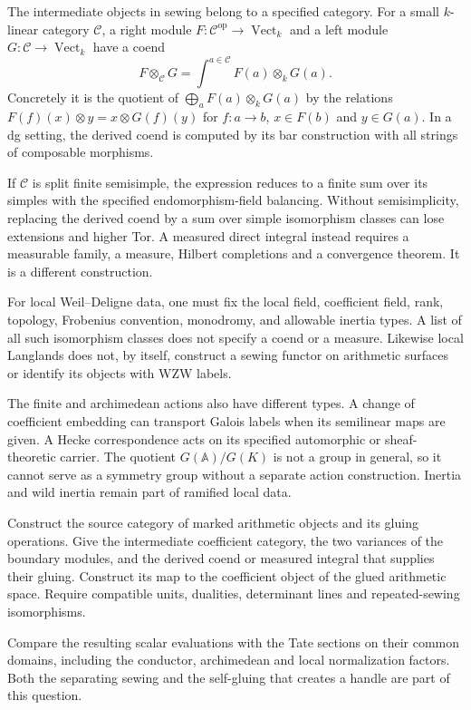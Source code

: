 The intermediate objects in sewing belong to a specified category. For a
small $k$-linear category $\mathcal C$, a right module $F:\mathcal
C^{\mathrm{op}}\to\operatorname{Vect}_k$ and a left module $G:\mathcal
C\to\operatorname{Vect}_k$ have a coend
\[
 F\otimes_{\mathcal C}G
    =\int^{a\in\mathcal C}F(a)\otimes_kG(a).
\]
Concretely it is the quotient of $\bigoplus_a F(a)\otimes_kG(a)$ by the
relations $F(f)(x)\otimes y=x\otimes G(f)(y)$ for $f:a\to b$, $x\in F(b)$
and $y\in G(a)$. In a dg setting, the derived coend is computed by its bar
construction with all strings of composable morphisms.

If $\mathcal C$ is split finite semisimple, the expression reduces to a
finite sum over its simples with the specified endomorphism-field balancing.
Without semisimplicity, replacing the derived coend by a sum over simple
isomorphism classes can lose extensions and higher Tor. A measured direct
integral instead requires a measurable family, a measure, Hilbert
completions and a convergence theorem. It is a different construction.

For local Weil--Deligne data, one must fix the local field, coefficient
field, rank, topology, Frobenius convention, monodromy, and allowable
inertia types. A list of all such isomorphism classes does not specify a
coend or a measure. Likewise local Langlands does not, by itself, construct
a sewing functor on arithmetic surfaces or identify its objects with WZW
labels.

The finite and archimedean actions also have different types. A change of
coefficient embedding can transport Galois labels when its semilinear maps
are given. A Hecke correspondence acts on its specified automorphic or
sheaf-theoretic carrier. The quotient $G(\mathbb A)/G(K)$ is not a group in
general, so it cannot serve as a symmetry group without a separate action
construction. Inertia and wild inertia remain part of ramified local data.

\begin{question}
\label{v4-arith:traces:sewing-question}
Construct the source category of marked arithmetic objects and its gluing
operations. Give the intermediate coefficient category, the two variances of
the boundary modules, and the derived coend or measured integral that
supplies their gluing. Construct its map to the coefficient object of the
glued arithmetic space. Require compatible units, dualities, determinant
lines and repeated-sewing isomorphisms.

Compare the resulting scalar evaluations with the Tate sections on their
common domains, including the conductor, archimedean and local normalization
factors. Both the separating sewing and the self-gluing that creates a
handle are part of this question.
\end{question}

